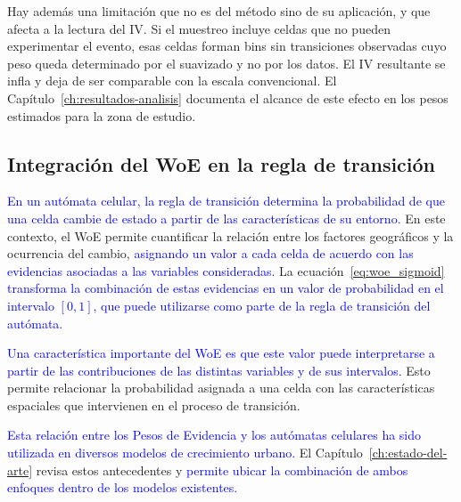 Hay además una limitación que no es del método sino de su aplicación, y que afecta a la lectura del IV. Si el muestreo incluye celdas que no pueden experimentar el evento, esas celdas forman bins sin transiciones observadas cuyo peso queda determinado por el suavizado y no por los datos. El IV resultante se infla y deja de ser comparable con la escala convencional. El Capítulo~\ref{ch:resultados-analisis} documenta el alcance de este efecto en los pesos estimados para la zona de estudio.

\subsection{Integración del WoE en la regla de transición}

\textcolor{blue}{En un autómata celular, la regla de transición determina la probabilidad de que una celda cambie de estado a partir de las características de su entorno.} En este contexto, el WoE permite cuantificar la relación entre los factores geográficos y la ocurrencia del cambio, \textcolor{blue}{asignando un valor a cada celda de acuerdo con las evidencias asociadas a las variables consideradas.} La ecuación~\ref{eq:woe_sigmoid} \textcolor{blue}{transforma la combinación de estas evidencias en un valor de probabilidad en el intervalo $[0,1]$, que puede utilizarse como parte de la regla de transición del autómata.}


\textcolor{blue}{Una característica importante del WoE es que este valor puede interpretarse a partir de las contribuciones de las distintas variables y de sus intervalos.} Esto permite relacionar la probabilidad asignada a una celda con las características espaciales que intervienen en el proceso de transición.

\textcolor{blue}{Esta relación entre los Pesos de Evidencia y los autómatas celulares ha sido utilizada en diversos modelos de crecimiento urbano.} El Capítulo~\ref{ch:estado-del-arte} revisa estos antecedentes y \textcolor{blue}{permite ubicar la combinación de ambos enfoques dentro de los modelos existentes.}


